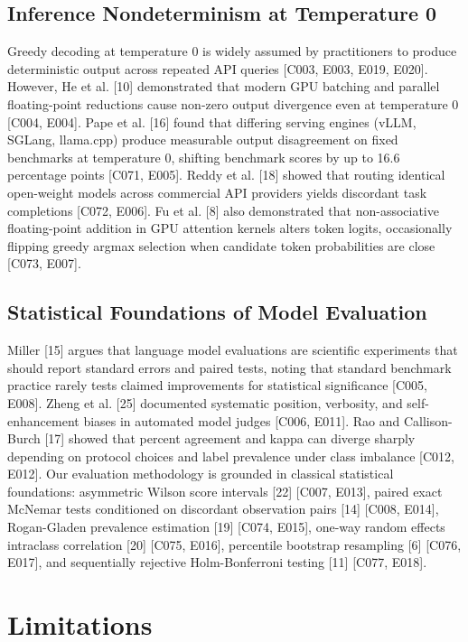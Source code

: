 \documentclass[11pt,letterpaper]{article}
\begin{document}
\subsection{Inference Nondeterminism at Temperature 0}
Greedy decoding at temperature 0 is widely assumed by practitioners to produce deterministic output across repeated API queries [C003, E003, E019, E020]. However, He et al. [10] demonstrated that modern GPU batching and parallel floating-point reductions cause non-zero output divergence even at temperature 0 [C004, E004]. Pape et al. [16] found that differing serving engines (vLLM, SGLang, llama.cpp) produce measurable output disagreement on fixed benchmarks at temperature 0, shifting benchmark scores by up to 16.6 percentage points [C071, E005]. Reddy et al. [18] showed that routing identical open-weight models across commercial API providers yields discordant task completions [C072, E006]. Fu et al. [8] also demonstrated that non-associative floating-point addition in GPU attention kernels alters token logits, occasionally flipping greedy argmax selection when candidate token probabilities are close [C073, E007].

\subsection{Statistical Foundations of Model Evaluation}
Miller [15] argues that language model evaluations are scientific experiments that should report standard errors and paired tests, noting that standard benchmark practice rarely tests claimed improvements for statistical significance [C005, E008]. Zheng et al. [25] documented systematic position, verbosity, and self-enhancement biases in automated model judges [C006, E011]. Rao and Callison-Burch [17] showed that percent agreement and kappa can diverge sharply depending on protocol choices and label prevalence under class imbalance [C012, E012]. Our evaluation methodology is grounded in classical statistical foundations: asymmetric Wilson score intervals [22] [C007, E013], paired exact McNemar tests conditioned on discordant observation pairs [14] [C008, E014], Rogan-Gladen prevalence estimation [19] [C074, E015], one-way random effects intraclass correlation [20] [C075, E016], percentile bootstrap resampling [6] [C076, E017], and sequentially rejective Holm-Bonferroni testing [11] [C077, E018].

\section{Limitations}
\end{document}
